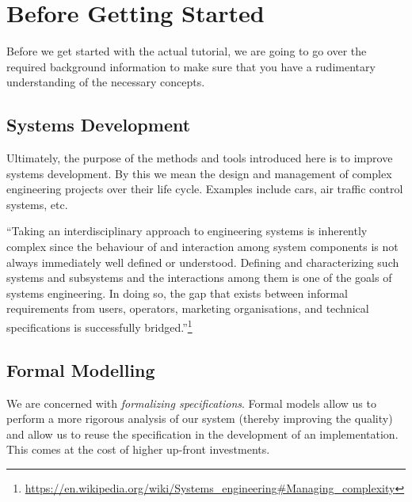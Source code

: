 \section{Before Getting Started}
\label{tut_before_getting_started}

Before we get started with the actual tutorial, we are going to go over the required background information to make sure that you have a rudimentary understanding of the necessary concepts.


\subsection{Systems Development}
\label{tut_systems_development}

Ultimately, the purpose of the methods and tools introduced here is to improve systems development.  By this we mean the design and management of complex engineering projects over their life cycle. Examples include cars, air traffic control systems, etc.

``Taking an interdisciplinary approach to engineering systems is inherently complex since the behaviour of and interaction among system components is not always immediately well defined or understood. Defining and characterizing such systems and subsystems and the interactions among them is one of the goals of systems engineering. In doing so, the gap that exists between informal requirements from users, operators, marketing organisations, and technical specifications is successfully bridged.''\footnote{\url{https://en.wikipedia.org/wiki/Systems_engineering\#Managing_complexity}}

\subsection{Formal Modelling}
\label{tut_formal_modelling}

We are concerned with \textit{formalizing specifications}.  Formal models allow us to perform a more rigorous analysis of our system (thereby improving the quality) and allow us to reuse the specification in the development of an implementation.  This comes at the cost of higher up-front investments.

